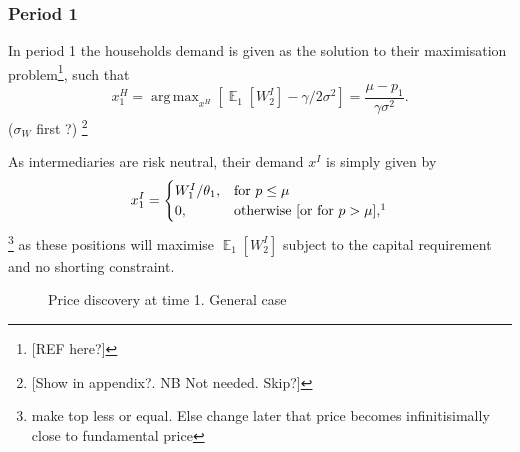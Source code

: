 \documentclass[11pt]{article}
\DeclareMathOperator{\E}{\mathbb{E}} %
\DeclareMathOperator*{\argmax}{arg\,max} %
\begin{document}
\subsubsection*{Period 1}
In period 1 the households demand is given as the solution to their maximisation problem\footnote{[REF here?]}, such that
\begin{equation} \label{e_xH}
x^{H}_1 = \argmax_{x^H}\left[\E_1[W^I_2] - \gamma/2\sigma^2\right]
= \frac{\mu - p_1}{\gamma\sigma^2}.
\end{equation}
($\sigma_W$ first ?)
\footnote{[Show in appendix?. NB Not needed. Skip?]}


As intermediaries are risk neutral, their demand $x^I$ is simply given by
\begin{equation}  \label{e_xI}
x^I_1 = \begin{cases}
 W^I_1/\theta_1, &\text{for $p \leq \mu$}\\
 0, &\text{otherwise [or for $p > \mu$],\footnotemark}
\end{cases}
\end{equation}
 \footnote{make top less or equal. Else change later that price becomes infinitisimally close to fundamental price}
\noindent as these positions will maximise $\E_1[W^I_2]$ subject to the capital requirement and no shorting constraint.

\begin{figure}[h]
\centering
{}
\caption{Price discovery at time 1. General case}
\label{fig:t1pricediscovery}
\end{figure}
\end{document}
